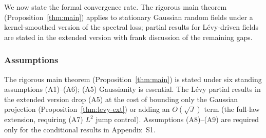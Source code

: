 \documentclass[10pt]{elsarticle}
\begin{document}
We now state the formal convergence rate. The rigorous main theorem
(Proposition~\ref{thm:main}) applies to stationary Gaussian random fields
under a kernel-smoothed version of the spectral loss; partial results
for L\'evy-driven fields are stated in
the extended version with frank discussion of the
remaining gaps.

\subsubsection{Assumptions}

The rigorous main theorem (Proposition~\ref{thm:main}) is stated under
six standing assumptions (A1)--(A6); (A5) Gaussianity is essential.
The L\'evy partial results in the extended version drop
(A5) at the cost of bounding only the Gaussian projection
(Proposition~\ref{thm:levy-ext}) or adding an $O(\sqrt{J})$ term
(the full-law extension, requiring (A7) $L^2$ jump control).
Assumptions (A8)--(A9) are required only for the conditional
results in Appendix~S1.
\end{document}
